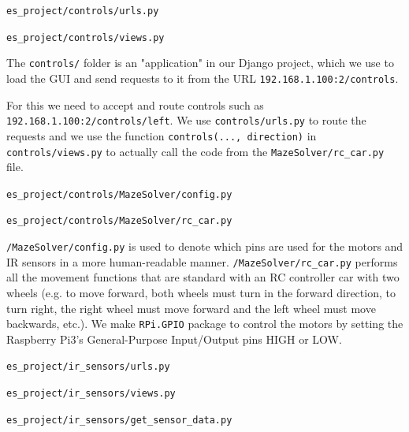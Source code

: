 \begin{description}[font=\quad $\circ$, topsep=6pt, itemsep=3em]
			
			
		\item \texttt{es\_project/controls/urls.py}
			
		\clearpage
		\item \texttt{es\_project/controls/views.py}
			
			
			The \texttt{controls/} folder is an "application" in our Django project, which we use to load the GUI and send requests to it from the URL \texttt{192.168.1.100:2/controls}. 
			
			For this we need to accept and route controls such as \texttt{192.168.1.100:2/controls/left}. We use \texttt{controls/urls.py} to route the requests and we use the function \texttt{controls(..., direction)} in \texttt{controls/views.py} to actually call the code from the \texttt{MazeSolver/rc\_car.py} file.
			
		\clearpage
		\item \texttt{es\_project/controls/MazeSolver/config.py}
			
		
		\item \texttt{es\_project/controls/MazeSolver/rc\_car.py}
			
			
			\texttt{/MazeSolver/config.py} is used to denote which pins are used for the motors and IR sensors in a more human-readable manner. \texttt{/MazeSolver/rc\_car.py} performs all the movement functions that are standard with an RC controller car with two wheels (e.g. to move forward, both wheels must turn in the forward direction, to turn right, the right wheel must move forward and the left wheel must move backwards, etc.). We make \texttt{RPi.GPIO} package to control the motors by setting the Raspberry Pi3's General-Purpose Input/Output pins HIGH or LOW.
		
		
		
		
		\item \texttt{es\_project/ir\_sensors/urls.py}
			
		
		\item \texttt{es\_project/ir\_sensors/views.py}
			
		\clearpage		
		\item \texttt{es\_project/ir\_sensors/get\_sensor\_data.py}
			
		

\end{description}
